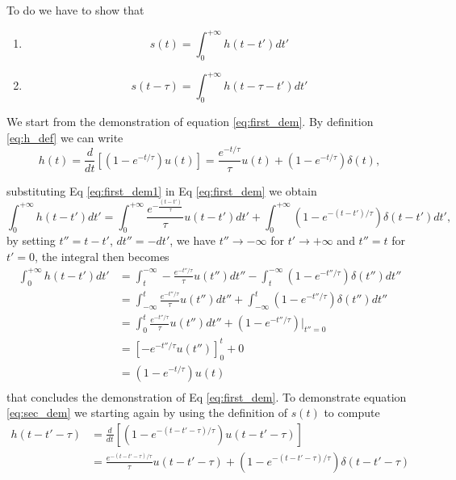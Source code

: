 To do we have to show that \begin{enumerate}
    \item \begin{equation}\label{eq:first_dem}
        s(t) = \int_0^{+\infty} h(t-t')dt'
    \end{equation}
    \item \begin{equation}\label{eq:sec_dem}
        s(t-\tau) = \int_{0}^{+\infty} h(t-\tau-t')dt'
    \end{equation}
\end{enumerate}

We start from the demonstration of equation \ref{eq:first_dem}. By definition \ref{eq:h_def} we can write
\begin{equation}\label{eq:first_dem1}
    h(t) = \frac{d}{dt} \left[ \left(1 - e^{-t/\tau} \right) u(t) \right] = \frac{e^{-t/\tau}}{\tau} u(t) + \left(1 - e^{-t/\tau} \right) \delta(t), 
\end{equation}

substituting Eq \ref{eq:first_dem1} in Eq \ref{eq:first_dem} we obtain \begin{equation}
    \int_{0}^{+\infty} h(t - t') dt' = \int_{0}^{+\infty} \frac{e^{-\frac{(t - t')}{\tau}}}{\tau} u(t - t') dt' + \int_{0}^{+\infty} \left(1 - e^{-(t - t')/\tau} \right) \delta(t - t') dt',
\end{equation}
by setting $t'' = t-t'$, $dt''=-dt'$,  we have $t''\rightarrow -\infty$ for $t'\rightarrow +\infty$ and $t''= t$ for $t'= 0$, the integral then becomes
\begin{align}
    \int_{0}^{+\infty} h(t - t') dt' &= \int_{t}^{-\infty} -\frac{e^{-t''/\tau}}{\tau} u(t'') dt'' - \int_{t}^{-\infty} \left(1 - e^{-t''/\tau} \right) \delta(t'') dt'' \\
    &= \int_{-\infty}^{t} \frac{e^{-t''/\tau}}{\tau} u(t'') dt'' + \int_{-\infty}^{t} \left(1 - e^{-t''/\tau} \right) \delta(t'') dt''\\
    &= \int_{0}^{t} \frac{e^{-t''/\tau}}{\tau} u(t'') dt'' + \left(1 - e^{-t''/\tau} \right) \Big|_{t''=0}\\
    &= \left[ -e^{-t''/\tau} u(t'') \right]_{0}^{t} + 0\\
    &= (1 - e^{-t/\tau}) u(t)\\
\end{align}
that concludes the demonstration of Eq \ref{eq:first_dem}.
To demonstrate equation \ref{eq:sec_dem} we starting again by using the definition of $s(t)$ to compute 
\begin{align}
    h(t -t'-\tau) &= \frac{d}{dt} \left[ \left(1 - e^{-(t-t'-\tau)/\tau} \right) u(t-t'-\tau) \right] \\
    &= \frac{e^{-(t-t'-\tau)/\tau}}{\tau} u(t-t'-\tau) + \left(1 - e^{-(t-t'-\tau)/\tau} \right) \delta(t-t'-\tau)\\ \label{eq:sec_dem2}
\end{align}

